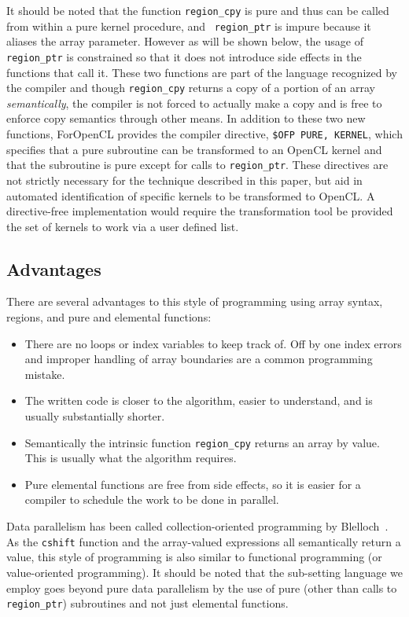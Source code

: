 It should be noted that the function {\tt region\_cpy} is pure and thus can be
called from within a pure kernel procedure, and {\tt
region\_ptr} is impure because it aliases the array parameter.  However as will
be shown below, the usage of {\tt region\_ptr} is constrained so that it does not
introduce side effects in the functions that call it.  These two functions are
part of the language recognized by the compiler and though {\tt region\_cpy}
returns a copy of a portion of an array \emph{semantically}, the compiler is not
forced to actually make a copy and is free to enforce copy semantics through
other means.  In addition to these two new functions, ForOpenCL provides the
compiler directive, {\tt \!\$OFP PURE, KERNEL}, which specifies that a pure subroutine
can be transformed to an OpenCL kernel and that the subroutine is pure
except for calls to {\tt region\_ptr}.  These directives are not strictly
necessary for the technique described in this paper, but aid in automated
identification of specific kernels to be transformed to OpenCL.  A directive-free
implementation would require the transformation tool be provided the set of 
kernels to work via a user defined list.

\subsection{Advantages}

There are several advantages to this style of programming using array
syntax, regions, and pure and elemental functions:

\begin{itemize}
\item There are no loops or index variables to keep track of.  Off by
  one index errors and improper handling of array boundaries are a
  common programming mistake.
\item The written code is closer to the algorithm, easier to
  understand, and is usually substantially shorter.
\item Semantically the intrinsic function {\tt region\_cpy} returns an array by value.
  This is usually what the algorithm requires.
\item Pure elemental functions are free from side effects, so it is
  easier for a compiler to schedule the work to be done in parallel.
\end{itemize}

Data parallelism has been called collection-oriented programming by
Blelloch~\cite{blelloch90}.  As the {\tt cshift} function and the array-valued
expressions all semantically return a value, this style of programming is also
similar to functional programming (or value-oriented programming).  It should be
noted that the sub-setting language we employ goes beyond pure data parallelism
by the use of pure (other than calls to {\tt region\_ptr}) subroutines and
not just elemental functions.

